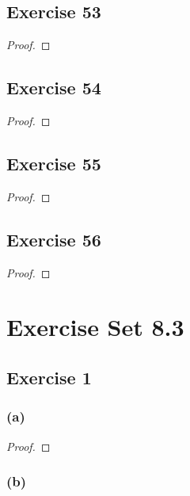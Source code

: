\documentclass[14pt]{extarticle}
\begin{document}
\subsection{Exercise 53}

\begin{proof}

\end{proof}

\subsection{Exercise 54}

\begin{proof}

\end{proof}

\subsection{Exercise 55}

\begin{proof}

\end{proof}

\subsection{Exercise 56}

\begin{proof}

\end{proof}

\section{Exercise Set 8.3}

\subsection{Exercise 1}

\subsubsection{(a)}

\begin{proof}

\end{proof}

\subsubsection{(b)}
\end{document}
